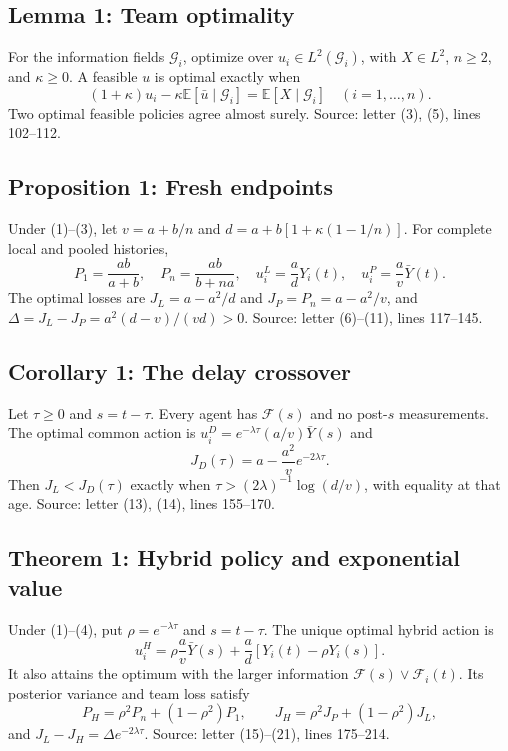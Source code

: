 \documentclass[11pt,letterpaper]{article}
\newcommand{\E}{\mathbb E}
\begin{document}
\subsection{Lemma 1: Team optimality}\label{contract-L}
For the information fields $\mathcal G_i$, optimize over $u_i\in L^2(\mathcal G_i)$, with $X\in L^2$, $n\ge2$, and $\kappa\ge0$. A feasible $u$ is optimal exactly when
\[
(1+\kappa)u_i-\kappa\E[\bar u\mid\mathcal G_i]=\E[X\mid\mathcal G_i]\quad(i=1,\ldots,n).
\]
Two optimal feasible policies agree almost surely.
\noindent Source: letter (3), (5), lines 102--112.

\subsection{Proposition 1: Fresh endpoints}\label{contract-P}
Under (1)--(3), let $v=a+b/n$ and $d=a+b[1+\kappa(1-1/n)]$. For complete local and pooled histories,
\[
P_1=\frac{ab}{a+b},\quad P_n=\frac{ab}{b+na},\quad
u_i^L=\frac adY_i(t),\quad u_i^P=\frac av\bar Y(t).
\]
The optimal losses are $J_L=a-a^2/d$ and $J_P=P_n=a-a^2/v$, and $\Delta=J_L-J_P=a^2(d-v)/(vd)>0$.
\noindent Source: letter (6)--(11), lines 117--145.

\subsection{Corollary 1: The delay crossover}\label{contract-D}
Let $\tau\ge0$ and $s=t-\tau$. Every agent has $\mathcal F(s)$ and no post-$s$ measurements. The optimal common action is $u_i^D=e^{-\lambda\tau}(a/v)\bar Y(s)$ and
\[
J_D(\tau)=a-\frac{a^2}{v}e^{-2\lambda\tau}.
\]
Then $J_L<J_D(\tau)$ exactly when $\tau>(2\lambda)^{-1}\log(d/v)$, with equality at that age.
\noindent Source: letter (13), (14), lines 155--170.

\subsection{Theorem 1: Hybrid policy and exponential value}\label{contract-H}
Under (1)--(4), put $\rho=e^{-\lambda\tau}$ and $s=t-\tau$. The unique optimal hybrid action is
\[
u_i^H=\rho\frac av\bar Y(s)+\frac ad[Y_i(t)-\rho Y_i(s)].
\]
It also attains the optimum with the larger information $\mathcal F(s)\vee\mathcal F_i(t)$. Its posterior variance and team loss satisfy
\[
P_H=\rho^2P_n+(1-\rho^2)P_1,\qquad
J_H=\rho^2J_P+(1-\rho^2)J_L,
\]
and $J_L-J_H=\Delta e^{-2\lambda\tau}$.
\noindent Source: letter (15)--(21), lines 175--214.
\end{document}
